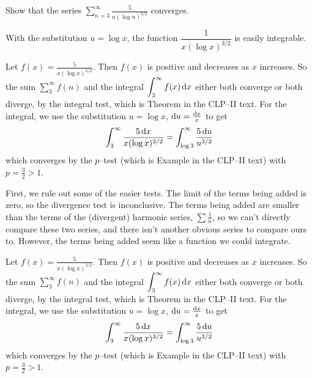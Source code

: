\begin{Mquestion}[2016Q5]
Show that the series $\displaystyle\sum_{n=3}^\infty \frac{5}{n(\log n)^{3/2}}$ converges.
\end{Mquestion}

\begin{hint}
With the substitution $u=\log x$, the function $\dfrac{1}{x(\log x)^{3/2}}$ is easily integrable.
\end{hint}

\begin{answer}
Let $\displaystyle f(x) = \frac{5}{x(\log x)^{3/2}}$.
Then $f(x)$ is positive and decreases as $x$ increases.
So the sum $\displaystyle\sum_3^{\infty} f(n)$ and the
integral $\displaystyle\int_3^\infty f(x) \,\mathrm{d}x$
either both converge or both diverge, by the integral test, which is
Theorem  in the CLP--II text.
For the integral, we use the substitution
$u = \log x$, $\mathrm{d}u = \frac{\mathrm{d}x}{x}$ to get
\begin{align*}
\int_3^\infty \frac{5 \,\mathrm{d}x}{x(\log x)^{3/2}} = \int_{\log 3}^\infty \frac{5 \,\mathrm{d}u}{u^{3/2}}
\end{align*}
which converges by the $p$--test (which is
Example  in the CLP--II text)
with $p=\frac{3}{2} > 1$.
\end{answer}

\begin{solution}
First, we rule out some of the easier tests. The limit of the terms being added is zero, so the divergence test is inconclusive. The terms being added are smaller than the terms of the (divergent) harmonic series, $\sum \frac{1}{n}$, so we can't directly compare these two series, and there isn't another obvious  series to compare ours to. However, the terms being added seem like a function we could integrate.

Let $\displaystyle f(x) = \frac{5}{x(\log x)^{3/2}}$.
Then $f(x)$ is positive and decreases as $x$ increases.
So the sum $\displaystyle\sum_3^{\infty} f(n)$ and the
integral $\displaystyle\int_3^\infty f(x) \,\mathrm{d}x$
either both converge or both diverge, by the integral test, which is
Theorem  in the CLP--II text.
For the integral, we use the substitution
$u = \log x$, $\mathrm{d}u = \frac{\mathrm{d}x}{x}$ to get
\begin{align*}
\int_3^\infty \frac{5 \,\mathrm{d}x}{x(\log x)^{3/2}} = \int_{\log 3}^\infty \frac{5 \,\mathrm{d}u}{u^{3/2}}
\end{align*}
which converges by the $p$--test (which is
Example  in the CLP--II text)
with $p=\frac{3}{2} > 1$.
\end{solution}

